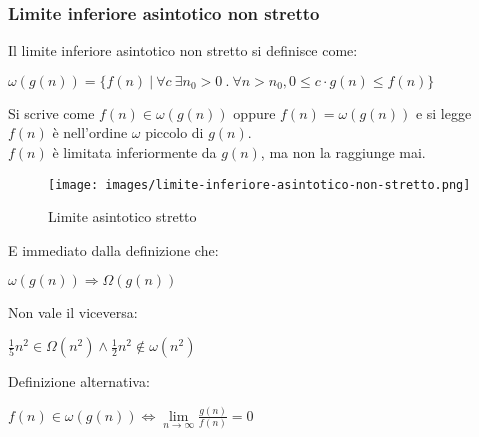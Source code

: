 \subsubsection{Limite inferiore asintotico non stretto}
\begin{definition}
Il limite inferiore asintotico non stretto si definisce come:
\begin{center}
    $\omega(g(n)) = \{f(n) \: |\: \forall c \: \exists n_0 > 0 \: . \: \forall n > n_0, 0 \leq c \cdot g(n) \leq f(n) \}$
\end{center}
\end{definition}
\hspace{-15pt}Si scrive come $f(n) \in \omega(g(n))$ oppure $f(n) = \omega(g(n))$ e si legge $f(n)$ è nell'ordine $\omega$ piccolo di $g(n)$.\\
$f(n)$ è limitata inferiormente da $g(n)$, ma non la raggiunge mai.\\
\begin{wrapfigure}[7]{l}{7cm}
    \vspace{-15pt}
    \centering
    \texttt{[image: images/limite-inferiore-asintotico-non-stretto.png]}
    \vspace{-5pt}
    \caption{Limite asintotico stretto}
\end{wrapfigure}

\vspace{-15pt}
E immediato dalla definizione che:
\begin{center}
    $\omega(g(n)) \Longrightarrow \Omega(g(n))$
\end{center}
Non vale il viceversa: 
\begin{center}
    $\frac{1}{5}n^2 \in \Omega(n^2) \land \frac{1}{2}n^2 \notin \omega(n^2)$
\end{center}
Definizione alternativa:
\begin{center}
    $f(n) \in \omega(g(n)) \Longleftrightarrow \lim\limits_{n\to \infty}\frac{g(n)}{f(n)} = 0$
\end{center}
